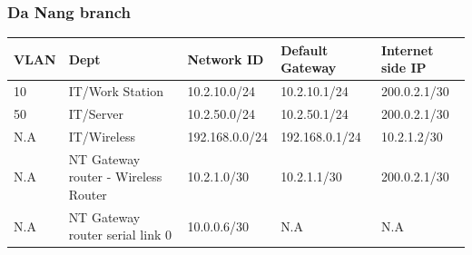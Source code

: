 \subsubsection{Da Nang branch}
\begin{center}
  \begin{tabular}{|p{}|p{}|p{}|p{}|p{}|}
  \hline
   VLAN & Dept & Network ID & Default Gateway & Internet side IP\\
   \hline
   10 & IT/Work Station
&10.2.10.0/24
&10.2.10.1/24
&200.0.2.1/30
 \\
 \hline
 50 & IT/Server
&10.2.50.0/24
&10.2.50.1/24
&200.0.2.1/30
\\
\hline
N.A &     IT/Wireless
&192.168.0.0/24
&192.168.0.1/24
&10.2.1.2/30
\\
\hline
N.A & NT Gateway router - Wireless Router
&10.2.1.0/30
&10.2.1.1/30
&200.0.2.1/30
\\
\hline
N.A & NT Gateway router serial link 0
&10.0.0.6/30
&N.A
&N.A
\\
\hline
   \end{tabular}
\end{center}